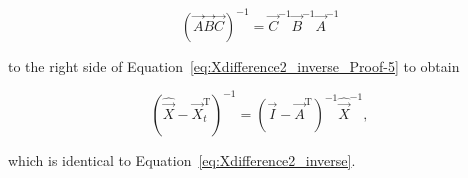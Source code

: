 \begin{equation} \label{eq:Xdifference2_inverse_Proof-6}
	{\left(\vec{A}\vec{B}\vec{C}\right)}^{-1} 
	= \vec{C}^{-1} \vec{B}^{-1} \vec{A}^{-1}
\end{equation}

\noindent to the right side of Equation~\ref{eq:Xdifference2_inverse_Proof-5} to obtain

\begin{equation} \label{eq:Xdifference2_inverse_Proof-7}
	{\left(\hat{\vec{X}} - \vec{X}_t^\mathrm{T}\right)}^{-1} 
	= {(\vec{I} - \vec{A}^{\mathrm{T}})}^{-1} \hat{\vec{X}}^{-1},
\end{equation}

\noindent which is identical to Equation~\ref{eq:Xdifference2_inverse}.





